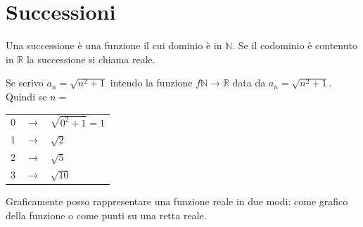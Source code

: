 \section{Successioni}
\begin{definition}[Successione]
    Una successione è una funzione il cui dominio è in $\mathbb{N}$. Se il codominio è contenuto in $\mathbb{R}$ la successione si chiama reale.
\end{definition}
\begin{example}
    Se scrivo $a_n=\sqrt{n^2+1}$ intendo la funzione $f\mathbb{N}\rightarrow\mathbb{R}$ data da $a_n=\sqrt{n^2+1}$. Quindi se $n=$
    \begin{table}[ht]
        \centering
        \begin{tabular}{ccl}
            0 & $\rightarrow$ & $\sqrt{0^2+1}=1$ \\
            1 & $\rightarrow$ & $\sqrt{2}$\\
            2 & $\rightarrow$ & $\sqrt{5}$\\
            3 & $\rightarrow$ & $\sqrt{10}$\\
        \end{tabular}
    \end{table}
\end{example}

Graficamente posso rappresentare una funzione reale in due modi: come grafico della funzione o come punti su una retta reale.

